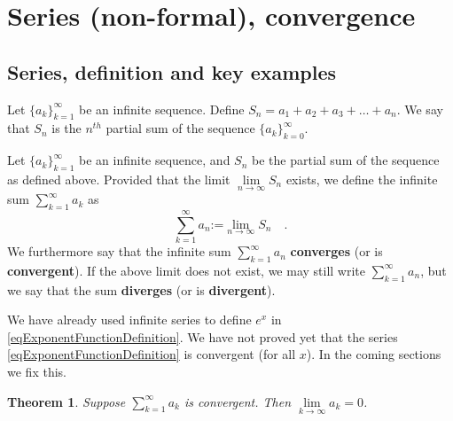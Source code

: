 \documentclass[12pt]{book}
\newcommand{\eqdef}{\textbf{:=}}
\newcommand{\importantFormula}[1]{\begin{equation} \boxed{#1} \end{equation}}
\newtheorem{theorem}{Theorem}[section]
\renewcommand{\emph}{\textbf}
\begin{document}
\section{Series (non-formal), convergence}\label{secSeriesConvergence}
\subsection{Series, definition and key examples}
Let $\{a_k\}_{k=1}^\infty$ be an infinite sequence. Define $S_n= a_1+a_2+a_3+\dots+a_n$. We say that $S_n$ is the $n^{th}$ partial sum of the sequence $\{a_k\}_{k=0}^\infty$.

Let $\{a_k\}_{k=1}^\infty$ be an infinite sequence, and $S_n$ be the partial sum of the sequence as defined above. Provided that the limit $\lim\limits_{n\to\infty} S_n$ exists, we define the infinite sum $\sum\limits_{k=1}^\infty a_k $ as
\importantFormula{
\sum_{k=1}^{\infty}a_n\eqdef \lim\limits_{n\to \infty} S_n\quad .
}
We furthermore say that the infinite sum $\sum\limits_{k=1}^{\infty}a_n$ \emph{converges} (or is \emph{convergent}). If the above limit does not exist, we may still write $\sum\limits_{k=1}^{\infty}a_n$, but we say that the sum \emph{diverges} (or is \emph{divergent}). 

We have already used infinite series to define $e^x$ in \eqref{eqExponentFunctionDefinition}. We have not proved yet that the series \eqref{eqExponentFunctionDefinition} is convergent (for all $x$). In the coming sections we fix this.

\begin{theorem}\label{thSummandsConvergentSeriesTendToZero}
Suppose $\sum\limits_{k=1}^\infty a_k$ is convergent. Then $\lim\limits_{k\to \infty } a_k=0$.
\end{theorem}
\end{document}
